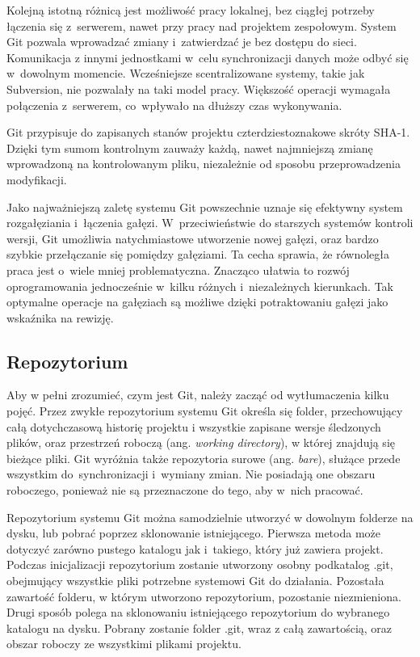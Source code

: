 \documentclass[12pt,a4paper,polish,thesis]{dcsbook}
\begin{document}
	Kolejną istotną różnicą jest możliwość pracy lokalnej, bez ciągłej potrzeby łączenia się z~serwerem, nawet przy pracy nad projektem zespołowym. System Git pozwala wprowadzać zmiany i~zatwierdzać je bez dostępu do sieci. Komunikacja z innymi jednostkami w~celu synchronizacji danych może odbyć się w~dowolnym momencie. Wcześniejsze scentralizowane systemy, takie jak Subversion, nie pozwalały na taki model pracy. Większość operacji wymagała połączenia z~serwerem, co~wpływało na dłuższy czas wykonywania.

	Git przypisuje do zapisanych stanów projektu czterdziestoznakowe skróty SHA-1. Dzięki tym sumom kontrolnym zauważy każdą, nawet najmniejszą zmianę wprowadzoną na kontrolowanym pliku, niezależnie od sposobu przeprowadzenia modyfikacji.

	Jako najważniejszą zaletę systemu Git powszechnie uznaje się efektywny system rozgałęziania i~łączenia gałęzi. W~przeciwieństwie do starszych systemów kontroli wersji, Git umożliwia natychmiastowe utworzenie nowej gałęzi, oraz bardzo szybkie przełączanie się pomiędzy gałęziami. Ta cecha sprawia, że równoległa praca jest o~wiele mniej problematyczna. Znacząco ułatwia to rozwój oprogramowania jednocześnie w~kilku różnych i~niezależnych kierunkach. Tak optymalne operacje na gałęziach są możliwe dzięki potraktowaniu gałęzi jako wskaźnika na rewizję.

	\subsection{Repozytorium}

	Aby w pełni zrozumieć, czym jest Git, należy zacząć od wytłumaczenia kilku pojęć. Przez zwykłe repozytorium systemu Git określa się folder, przechowujący całą dotychczasową historię projektu i wszystkie zapisane wersje śledzonych plików, oraz przestrzeń roboczą (ang. \textit{working directory}), w której znajdują się bieżące pliki. Git wyróżnia także repozytoria surowe (ang. \textit{bare}), służące przede wszystkim do~synchronizacji i~wymiany zmian. Nie posiadają one obszaru roboczego, ponieważ nie są przeznaczone do tego, aby w~nich pracować.

	Repozytorium systemu Git można samodzielnie utworzyć w dowolnym folderze na dysku, lub pobrać poprzez sklonowanie istniejącego. Pierwsza metoda może dotyczyć zarówno pustego katalogu jak i~takiego, który już zawiera projekt. Podczas inicjalizacji repozytorium zostanie utworzony osobny podkatalog .git, obejmujący wszystkie pliki potrzebne systemowi Git do działania. Pozostała zawartość folderu, w którym utworzono repozytorium, pozostanie niezmieniona. Drugi sposób polega na sklonowaniu istniejącego repozytorium do wybranego katalogu na dysku. Pobrany zostanie folder .git, wraz z całą zawartością, oraz obszar roboczy ze wszystkimi plikami projektu.
\end{document}
